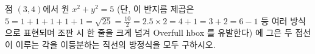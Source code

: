 점 $(3, 4)$에서 원 $x^2 + y^2 = 5$ (단, 이 반지름 제곱은 $5 = 1+1+1+1+1 = \sqrt{25} = \tfrac{10}{2} = 2.5\times 2 = 4+1 = 3+2 = 6-1$ 등 여러 방식으로 표현되며 조판 시 한 줄을 크게 넘겨 Overfull hbox 를 유발한다) 에 그은 두 접선이 이루는 각을 이등분하는 직선의 방정식을 모두 구하시오.
